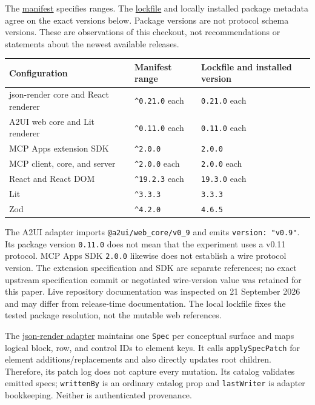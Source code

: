 \documentclass[11pt]{article}
\newcounter{none}
\begin{document}
The \href{../package.json}{manifest} specifies ranges. The
\href{../package-lock.json}{lockfile} and locally installed package
metadata agree on the exact versions below. Package versions are not
protocol schema versions. These are observations of this checkout, not
recommendations or statements about the newest available releases.

{\def\LTcaptype{none} %
\begin{longtable}[]{@{}lll@{}}
\toprule\noalign{}
Configuration & Manifest range & Lockfile and installed version \\
\midrule\noalign{}
\endhead
\bottomrule\noalign{}
\endlastfoot
json-render core and React renderer & \texttt{\^{}0.21.0} each &
\texttt{0.21.0} each \\
A2UI web core and Lit renderer & \texttt{\^{}0.11.0} each &
\texttt{0.11.0} each \\
MCP Apps extension SDK & \texttt{\^{}2.0.0} & \texttt{2.0.0} \\
MCP client, core, and server & \texttt{\^{}2.0.0} each & \texttt{2.0.0}
each \\
React and React DOM & \texttt{\^{}19.2.3} each & \texttt{19.3.0} each \\
Lit & \texttt{\^{}3.3.3} & \texttt{3.3.3} \\
Zod & \texttt{\^{}4.2.0} & \texttt{4.6.5} \\
\end{longtable}
}

The A2UI adapter imports \texttt{@a2ui/web\_core/v0\_9} and emits
\texttt{version:\ "v0.9"}. Its package version \texttt{0.11.0} does not
mean that the experiment uses a v0.11 protocol. MCP Apps SDK
\texttt{2.0.0} likewise does not establish a wire protocol version. The
extension specification and SDK are separate references; no exact
upstream specification commit or negotiated wire-version value was
retained for this paper. Live repository documentation was inspected on
21 September 2026 and may differ from release-time documentation. The
local lockfile fixes the tested package resolution, not the mutable web
references.

The \href{../src/adapters/json-render/adapter.ts}{json-render adapter}
maintains one \texttt{Spec} per conceptual surface and maps logical
block, row, and control IDs to element keys. It calls
\texttt{applySpecPatch} for element additions/replacements and also
directly updates root children. Therefore, its patch log does not
capture every mutation. Its catalog validates emitted specs;
\texttt{writtenBy} is an ordinary catalog prop and \texttt{lastWriter}
is adapter bookkeeping. Neither is authenticated provenance.
\end{document}
